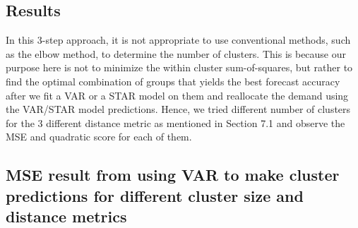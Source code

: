 \documentclass[nonblindrev,msom]{informs3} %
\begin{document}
\subsection{Results}

In this 3-step approach, it is not appropriate to use conventional methods, such as the elbow method, to determine the number of clusters. This is because our purpose here is not to minimize the within cluster sum-of-squares, but rather to find the optimal combination of groups that yields the best forecast accuracy after we fit a VAR or a STAR model on them and reallocate the demand using the VAR/STAR model predictions. Hence, we tried different number of clusters for the 3 different distance metric as mentioned in Section 7.1 and observe the MSE and quadratic score for each of them.

\subsection{MSE result from using VAR to make cluster predictions for different cluster size and distance metrics}
\end{document}
